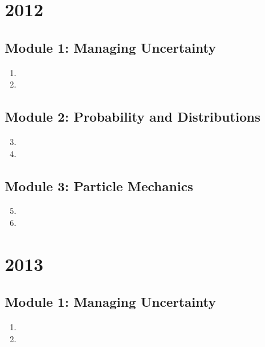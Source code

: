\documentclass{solutionsmannual}
\begin{document}
\chapter{2012}
\section{Module 1: Managing Uncertainty}
\begin{enumerate}[label=\bfseries  \arabic*.]\setcounter{enumi}{0}
\item 
\item 
\end{enumerate}
\section{Module 2: Probability and Distributions}
\begin{enumerate}[label=\bfseries  \arabic*.]\setcounter{enumi}{2}
\item 
\item 
\end{enumerate}
\section{Module 3: Particle Mechanics}
\begin{enumerate}[label=\bfseries  \arabic*.]\setcounter{enumi}{4}
\item 
\item 
\end{enumerate}

\chapter{2013}
\section{Module 1: Managing Uncertainty}
\begin{enumerate}[label=\bfseries  \arabic*.]\setcounter{enumi}{0}
\item 
\item 
\end{enumerate}
\end{document}
